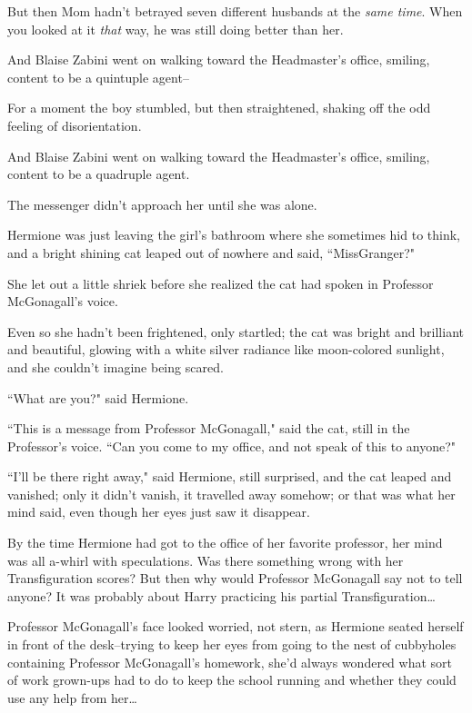 But then Mom hadn't betrayed seven different husbands at the \emph{same time}. When you looked at it \emph{that} way, he was still doing better than her.

And Blaise Zabini went on walking toward the Headmaster's office, smiling, content to be a quintuple agent\---

For a moment the boy stumbled, but then straightened, shaking off the odd feeling of disorientation.

And Blaise Zabini went on walking toward the Headmaster's office, smiling, content to be a quadruple agent.


The messenger didn't approach her until she was alone.

Hermione was just leaving the girl's bathroom where she sometimes hid to think, and a bright shining cat leaped out of nowhere and said, ``Miss\?Granger?"

She let out a little shriek before she realized the cat had spoken in Professor McGonagall's voice.

Even so she hadn't been frightened, only startled; the cat was bright and brilliant and beautiful, glowing with a white silver radiance like moon-colored sunlight, and she couldn't imagine being scared.

``What are you?" said Hermione.

``This is a message from Professor McGonagall," said the cat, still in the Professor's voice. ``Can you come to my office, and not speak of this to anyone?"

``I'll be there right away," said Hermione, still surprised, and the cat leaped and vanished; only it didn't vanish, it travelled away somehow; or that was what her mind said, even though her eyes just saw it disappear.

By the time Hermione had got to the office of her favorite professor, her mind was all a-whirl with speculations. Was there something wrong with her Transfiguration scores? But then why would Professor McGonagall say not to tell anyone? It was probably about Harry practicing his partial Transfiguration{\ldots}

Professor McGonagall's face looked worried, not stern, as Hermione seated herself in front of the desk\---trying to keep her eyes from going to the nest of cubbyholes containing Professor McGonagall's homework, she'd always wondered what sort of work grown-ups had to do to keep the school running and whether they could use any help from her{\ldots}

